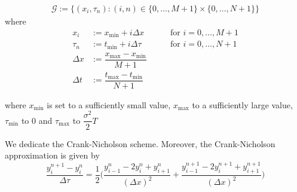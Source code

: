\begin{align}
  \mathcal{G} := \{(x_i, \tau_n): (i, n) \in \{0, \dots, M+1\} \times \{0, \dots, N+1\}\}
\end{align}
where 
\begin{align}
  \label{eq:lcp:overview:grid_2}
  x_i &:= x_{\text{min}} + i\Delta{x} &  \qquad \text{for $i = 0,\dots, M+1$} \\
  \tau_n &:= t_{\text{min}} + i{\Delta{\tau}} & \qquad \text{for $i = 0,\dots, N+1$} \\
  \Delta{x} &:= \dfrac{x_{\text{max}} - x_{\text{min}}}{M+1} \\ 
  \Delta{t} &:= \dfrac{t_{\text{max}} - t_{\text{min}}}{N+1}
\end{align}

where $x_{\text{min}}$ is set to a sufficiently small value, $x_{\text{max}}$ to a sufficiently large value, $\tau_{\text{min}}$ to 0 and $\tau_{\text{max}}$ to $\dfrac{\sigma^2}{2}T$

We dedicate the Crank-Nicholson scheme. Moreover, the Crank-Nicholson approximation is given by 
\begin{equation}
  \dfrac{y^{n+1}_{i} - y^{n}_{i}}{\Delta \tau} = \dfrac{1}{2}\bigg(\dfrac{y^{n}_{i-1} - 2y^{n}_{i} + y^{n}_{i+1}}{(\Delta x)^2} + \dfrac{y^{n+1}_{i-1} - 2y^{n+1}_{i} + y^{n+1}_{i+1}}{(\Delta x)^2}\bigg)
\end{equation}

